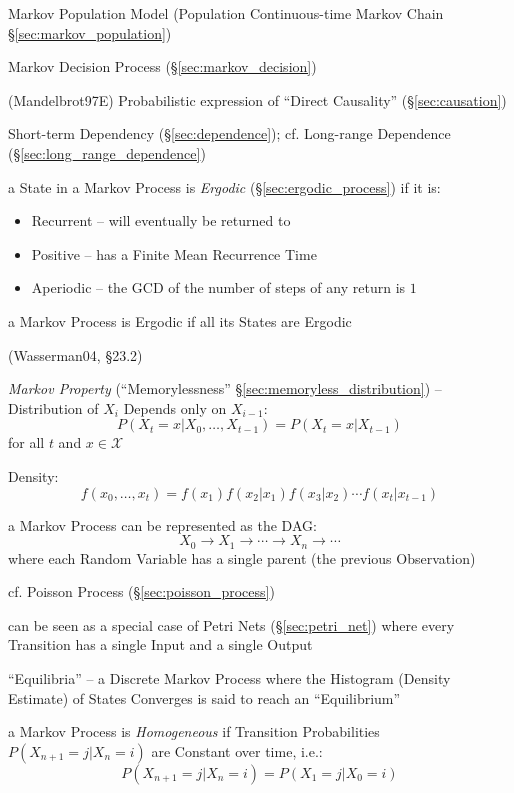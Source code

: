 \fist Markov Population Model (Population Continuous-time Markov Chain
\S\ref{sec:markov_population})

\fist Markov Decision Process (\S\ref{sec:markov_decision})

(Mandelbrot97E) Probabilistic expression of ``Direct Causality''
(\S\ref{sec:causation})

Short-term Dependency (\S\ref{sec:dependence}); cf. Long-range Dependence
(\S\ref{sec:long_range_dependence})

a State in a Markov Process is \emph{Ergodic} (\S\ref{sec:ergodic_process}) if
it is:
\begin{itemize}
  \item Recurrent -- will eventually be returned to
  \item Positive -- has a Finite Mean Recurrence Time
  \item Aperiodic -- the GCD of the number of steps of any return is $1$
\end{itemize}
a Markov Process is Ergodic if all its States are Ergodic


(Wasserman04, \S23.2)

\emph{Markov Property} (``Memorylessness'' \S\ref{sec:memoryless_distribution})
-- Distribution of $X_i$ Depends only on $X_{i-1}$:
\[
  P(X_t = x | X_0, \ldots, X_{t-1}) = P(X_t = x | X_{t-1})
\]
for all $t$ and $x \in \mathcal{X}$

Density:
\[
  f(x_0, \ldots, x_t) = f(x_1)f(x_2|x_1)f(x_3|x_2) \cdots f(x_t|x_{t-1})
\]

a Markov Process can be represented as the DAG:
\[
  X_0 \longrightarrow X_1 \longrightarrow \cdots \longrightarrow X_n
    \longrightarrow \cdots
\]
where each Random Variable has a single parent (the previous Observation)

cf. Poisson Process (\S\ref{sec:poisson_process})

\fist can be seen as a special case of Petri Nets (\S\ref{sec:petri_net}) where
every Transition has a single Input and a single Output

``Equilibria'' -- a Discrete Markov Process where the Histogram (Density
Estimate) of States Converges is said to reach an ``Equilibrium''

a Markov Process is \emph{Homogeneous} if Transition Probabilities
$P(X_{n+1} = j | X_n = i)$ are Constant over time, i.e.:
\[
  P(X_{n+1} = j | X_n = i) = P(X_1 = j| X_0 = i)
\]


